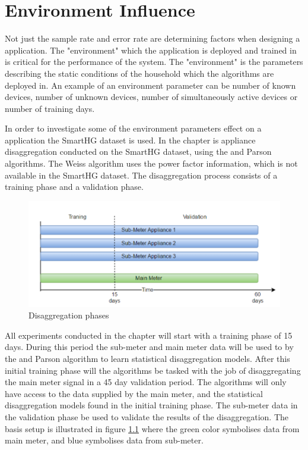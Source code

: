 \chapter{Environment Influence } 
\label{sec:EnvInf}
Not just the sample rate and error rate are determining factors when designing a  application. The "environment" which the application is deployed and trained in is critical for the performance of the system. The "environment" is the parameters describing the static conditions of the household which the algorithms are deployed in. An example of an environment parameter can be number of known devices, number of unknown devices, number of simultaneously active devices or number of training days.

In order to investigate some of the environment parameters effect on a  application the SmartHG dataset is used. In the chapter is appliance disaggregation conducted on the SmartHG dataset, using the  and Parson algorithms. The Weiss algorithm uses the power factor information, which is not available in the SmartHG dataset. The disaggregation process consists of a training phase and a validation phase. 

\begin{figure}[H]
\centering
\includegraphics[width=1\textwidth]{billeder/REAL.png}
\caption{Disaggregation phases}
\label{fig:IDF}
\end{figure}

All experiments conducted in the chapter will start with a training phase of 15 days. During this period the sub-meter and main meter data will be used to by the  and Parson algorithm to learn statistical disaggregation models. After this initial training phase will the algorithms be tasked with the job of disaggregating the main meter signal in a 45 day validation period. The algorithms will only have access to the data supplied by the main meter, and the statistical disaggregation models found in the initial training phase. The sub-meter data in the validation phase be used to validate the results of the disaggregation. The basis setup is illustrated in figure \ref{fig:IDF} where the green color symbolises data from main meter, and blue symbolises data from sub-meter. 


